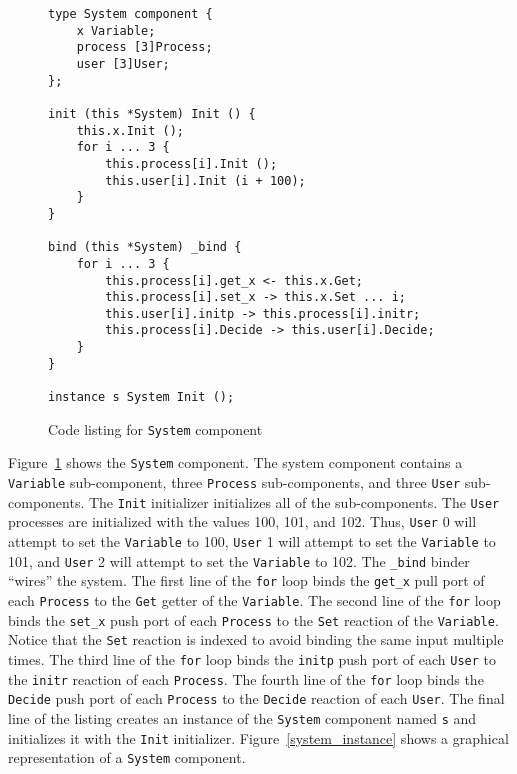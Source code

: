 \begin{figure}
\begin{verbatim}
type System component {
    x Variable;
    process [3]Process;
    user [3]User;
};

init (this *System) Init () {
    this.x.Init ();
    for i ... 3 {
        this.process[i].Init ();
        this.user[i].Init (i + 100);
    }
}

bind (this *System) _bind {
    for i ... 3 {
        this.process[i].get_x <- this.x.Get;
        this.process[i].set_x -> this.x.Set ... i;
        this.user[i].initp -> this.process[i].initr;
        this.process[i].Decide -> this.user[i].Decide;
    }
}

instance s System Init ();
\end{verbatim}
\cprotect\caption{Code listing for \verb+System+ component}
\label{system}
\end{figure}

Figure~\ref{system} shows the \verb+System+ component.
The system component contains a \verb+Variable+ sub-component, three \verb+Process+ sub-components, and three \verb+User+ sub-components.
The \verb+Init+ initializer initializes all of the sub-components.
The \verb+User+ processes are initialized with the values 100, 101, and 102.
Thus, \verb+User+ 0 will attempt to set the \verb+Variable+ to 100, \verb+User+ 1 will attempt to set the \verb+Variable+ to 101, and \verb+User+ 2 will attempt to set the \verb+Variable+ to 102.
The \verb+_bind+ binder ``wires'' the system.
The first line of the \verb+for+ loop binds the \verb+get_x+ pull port of each \verb+Process+ to the \verb+Get+ getter of the \verb+Variable+.
The second line of the \verb+for+ loop binds the \verb+set_x+ push port of each \verb+Process+ to the \verb+Set+ reaction of the \verb+Variable+.
Notice that the \verb+Set+ reaction is indexed to avoid binding the same input multiple times.
The third line of the \verb+for+ loop binds the \verb+initp+ push port of each \verb+User+ to the \verb+initr+ reaction of each \verb+Process+.
The fourth line of the \verb+for+ loop binds the \verb+Decide+ push port of each \verb+Process+ to the \verb+Decide+ reaction of each \verb+User+.
The final line of the listing creates an instance of the \verb+System+ component named \verb+s+ and initializes it with the \verb+Init+ initializer.
Figure~\ref{system_instance} shows a graphical representation of a \verb+System+ component.

